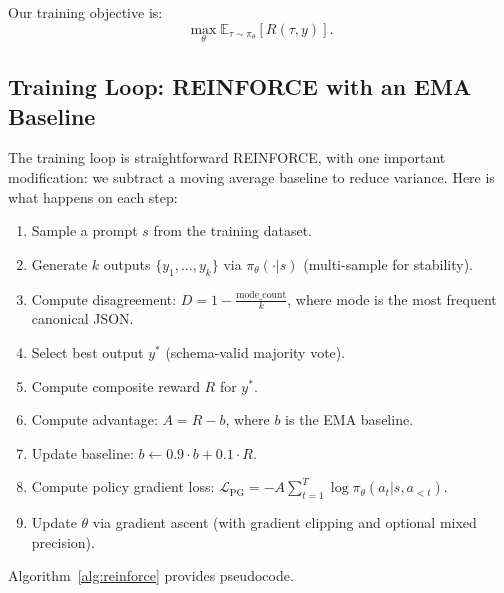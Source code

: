 \documentclass[11pt]{article}
\begin{document}
Our training objective is:
\begin{equation}
\max_{\theta} \mathbb{E}_{\tau \sim \pi_\theta} [R(\tau, y)].
\end{equation}

\subsection{Training Loop: REINFORCE with an EMA Baseline}

The training loop is straightforward REINFORCE, with one important modification: we subtract a moving average baseline to reduce variance.
Here is what happens on each step:
\begin{enumerate}[leftmargin=12pt]
    \item Sample a prompt $s$ from the training dataset.
    \item Generate $k$ outputs $\{y_1, \ldots, y_k\}$ via $\pi_\theta(\cdot | s)$ (multi-sample for stability).
    \item Compute disagreement: $D = 1 - \frac{\text{mode\_count}}{k}$, where mode is the most frequent canonical JSON.
    \item Select best output $y^*$ (schema-valid majority vote).
    \item Compute composite reward $R$ for $y^*$.
    \item Compute advantage: $A = R - b$, where $b$ is the EMA baseline.
    \item Update baseline: $b \leftarrow 0.9 \cdot b + 0.1 \cdot R$.
    \item Compute policy gradient loss: $\mathcal{L}_{\text{PG}} = -A \sum_{t=1}^{T} \log \pi_\theta(a_t | s, a_{<t})$.
    \item Update $\theta$ via gradient ascent (with gradient clipping and optional mixed precision).
\end{enumerate}

Algorithm~\ref{alg:reinforce} provides pseudocode.
\end{document}
